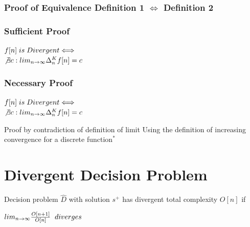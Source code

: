 \documentclass[11pt]{article}
\begin{document}
\subsubsection{Proof of Equivalence Definition 1 $\Leftrightarrow$ Definition 2}

\subsubsection{Sufficient Proof}
\begin{center}
\vspace{2mm}
$
f[n]\hspace{1mm} is \hspace{1mm} Divergent \Longleftrightarrow
$
\\ \vspace{4mm}
$
\not \exists c: lim_{n\rightarrow \infty} \Delta_n^K f[n] = c
$
\end{center}



\subsubsection{Necessary Proof}
\begin{center}
\vspace{2mm}
$
f[n]\hspace{1mm} is \hspace{1mm} Divergent \Longleftrightarrow
$
\\ \vspace{4mm}
$
\not \exists c: lim_{n\rightarrow \infty} \Delta_n^K f[n] = c
$
\end{center}








Proof by contradiction of definition of limit
Using the definition of increasing convergence for a discrete function$^*$




\section{Divergent Decision Problem}
Decision problem $\hat{D}$ with solution $s^+$ has divergent total complexity $O[n]$ if
\begin{center}
$
lim_{n \rightarrow \infty} \frac{O[n+1]}{O[n]} \hspace{2mm} diverges
$
\end{center}
\end{document}

